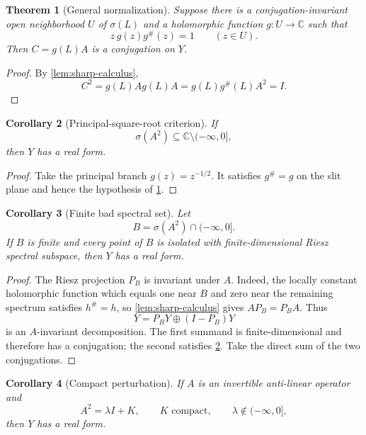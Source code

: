 \documentclass[11pt]{article}
\newtheorem{theorem}{Theorem}[section]
\newtheorem{corollary}[theorem]{Corollary}
\theoremstyle{definition}
\theoremstyle{remark}
\newcommand{\C}{\mathbb C}
\newcommand{\spec}{\sigma}
\begin{document}
\begin{theorem}[General normalization]\label{thm:general-normalization}
Suppose there is a conjugation-invariant open neighborhood $U$ of $\spec(L)$ and a holomorphic function $g:U\to\C$ such that
\[
       z\,g(z)g^{\#}(z)=1
       \qquad (z\in U).
\]
Then $C=g(L)A$ is a conjugation on $Y$.
\end{theorem}

\begin{proof}
By \cref{lem:sharp-calculus},
\[
 C^2=g(L)A g(L)A
     =g(L)g^{\#}(L)A^2
     =I.
\]
\end{proof}

\begin{corollary}[Principal-square-root criterion]\label{cor:principal-root}
If
\[
       \spec(A^2)\subseteq\C\setminus(-\infty,0],
\]
then $Y$ has a real form.
\end{corollary}

\begin{proof}
Take the principal branch $g(z)=z^{-1/2}$. It satisfies $g^{\#}=g$ on the slit plane and hence the hypothesis of \cref{thm:general-normalization}.
\end{proof}

\begin{corollary}[Finite bad spectral set]\label{cor:finite-bad}
Let
\[
 B=\spec(A^2)\cap(-\infty,0].
\]
If $B$ is finite and every point of $B$ is isolated with finite-dimensional Riesz spectral subspace, then $Y$ has a real form.
\end{corollary}

\begin{proof}
The Riesz projection $P_B$ is invariant under $A$. Indeed, the locally constant holomorphic function which equals one near $B$ and zero near the remaining spectrum satisfies $h^{\#}=h$, so \cref{lem:sharp-calculus} gives $AP_B=P_BA$. Thus
\[
 Y=P_BY\oplus(I-P_B)Y
\]
is an $A$-invariant decomposition. The first summand is finite-dimensional and therefore has a conjugation; the second satisfies \cref{cor:principal-root}. Take the direct sum of the two conjugations.
\end{proof}

\begin{corollary}[Compact perturbation]\label{cor:compact-square}
If $A$ is an invertible anti-linear operator and
\[
       A^2=\lambda I+K,
       \qquad K\text{ compact},\qquad
       \lambda\notin(-\infty,0],
\]
then $Y$ has a real form.
\end{corollary}
\end{document}
